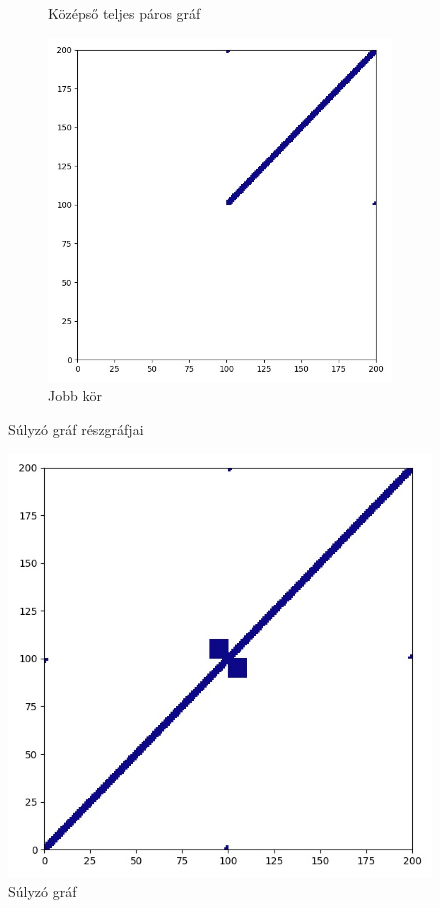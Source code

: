 \begin{figure}[H]
\begin{subfigure}{.3\linewidth}
    \caption{Középső teljes páros gráf}
    \label{fig:sub2}
  \end{subfigure}
  \begin{subfigure}{.3\linewidth}
    \centering
    \includegraphics[width=\linewidth]{./figures/sulyzo/subgraph_01.jpg}
    \caption{Jobb kör}
    \label{fig:sub3}
  \end{subfigure}
  \caption{Súlyzó gráf részgráfjai}
  \label{fig:all}
\end{figure}

\begin{figure}[H]
  \centering
  \includegraphics[width=0.5\linewidth]{./figures/sulyzo/graph.jpg}
  \caption{Súlyzó gráf}
\end{figure}

